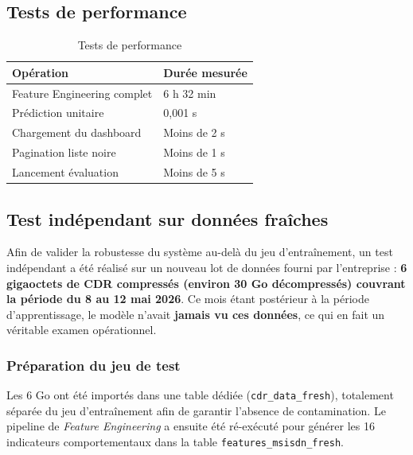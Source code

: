 \documentclass[12pt, oneside, a4paper]{report}
\begin{document}
\subsection{Tests de performance}
\begin{table}[H]
\centering
\caption{Tests de performance}
\label{tab:tests-perf}

\renewcommand{\arraystretch}{1.3}
\begin{tabular}{|l|l|}
\hline
\textbf{Opération} & \textbf{Durée mesurée} \\
\hline
Feature Engineering complet & 6 h 32 min \\
\hline
Prédiction unitaire & 0,001 s \\
\hline
Chargement du dashboard & Moins de 2 s \\
\hline
Pagination liste noire & Moins de 1 s \\
\hline
Lancement évaluation & Moins de 5 s \\
\hline
\end{tabular}
\end{table}

\subsection{Test indépendant sur données fraîches}

Afin de valider la robustesse du système au-delà du jeu d'entraînement,
un test indépendant a été réalisé sur un nouveau lot de données fourni
par l'entreprise : \textbf{6 gigaoctets de CDR compressés
(environ 30 Go décompressés) couvrant la période du 8 au 12 mai 2026}.
Ce mois étant postérieur à la période d'apprentissage, le modèle n'avait
\textbf{jamais vu ces données}, ce qui en fait un véritable examen
opérationnel.

\subsubsection{Préparation du jeu de test}
Les 6 Go ont été importés dans une table dédiée
(\texttt{cdr\_data\_fresh}), totalement séparée du jeu d'entraînement
afin de garantir l'absence de contamination. Le pipeline de
\emph{Feature Engineering} a ensuite été ré-exécuté pour générer les
16 indicateurs comportementaux dans la table
\texttt{features\_msisdn\_fresh}.
\end{document}
